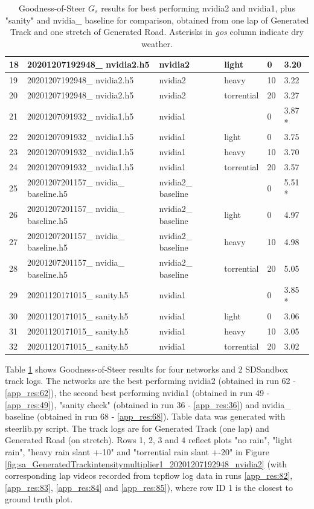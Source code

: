 \begin{table}[]
\begin{center}
\begin{tabular}{|l|l|l|l|l|l|}
18 & 20201207192948\_ nvidia2.h5 & nvidia2 & light & 0 & 3.20 \\ \hline
19 & 20201207192948\_ nvidia2.h5 & nvidia2 & heavy & 10 & 3.22 \\ \hline
20 & 20201207192948\_ nvidia2.h5 & nvidia2 & torrential & 20 & 3.27 \\ \hline
21 & 20201207091932\_ nvidia1.h5 & nvidia1 &  & 0 & 3.87 * \\ \hline
22 & 20201207091932\_ nvidia1.h5 & nvidia1 & light & 0 & 3.75 \\ \hline
23 & 20201207091932\_ nvidia1.h5 & nvidia1 & heavy & 10 & 3.70 \\ \hline
24 & 20201207091932\_ nvidia1.h5 & nvidia1 & torrential & 20 & 3.57 \\ \hline
25 & 20201207201157\_ nvidia\_ baseline.h5 & nvidia2\_ baseline &  & 0 & 5.51 * \\ \hline
26 & 20201207201157\_ nvidia\_ baseline.h5 & nvidia2\_ baseline & light & 0 & 4.97 \\ \hline
27 & 20201207201157\_ nvidia\_ baseline.h5 & nvidia2\_ baseline & heavy & 10 & 4.98 \\ \hline
28 & 20201207201157\_ nvidia\_ baseline.h5 & nvidia2\_ baseline & torrential & 20 & 5.05 \\ \hline
29 & 20201120171015\_ sanity.h5 & nvidia1 &  & 0 & 3.85 * \\ \hline
30 & 20201120171015\_ sanity.h5 & nvidia1 & light & 0 & 3.06 \\ \hline
31 & 20201120171015\_ sanity.h5 & nvidia1 & heavy & 10 & 3.05 \\ \hline
32 & 20201120171015\_ sanity.h5 & nvidia1 & torrential & 20 & 3.02 \\ \hline
\end{tabular}
\end{center}
\caption{Goodness-of-Steer $G_s$ results for best performing nvidia2 and nvidia1, plus "sanity" and nvidia\_ baseline for comparison, obtained from one lap of Generated Track and one stretch of Generated Road. Asterisks in \textit{gos} column indicate dry weather.}
\label{table:goodness-of-steer}
\end{table}
Table \ref{table:goodness-of-steer} shows Goodness-of-Steer results for four networks and 2 SDSandbox track logs. The networks are the best performing nvidia2 (obtained in run 62 - \ref{app_res:62}), the second best performing nvidia1 (obtained in run 49 - \ref{app_res:49}), "sanity check" (obtained in run 36 - \ref{app_res:36}) and nvidia\_ baseline (obtained in run 68 - \ref{app_res:68}). Table data was generated with steerlib.py script. The track logs are for Generated Track (one lap) and Generated Road (on stretch). Rows 1, 2, 3 and 4 reflect plots "no rain", "light rain", "heavy rain slant +-10" and "torrential rain slant +-20" in Figure \ref{fig:sa_GeneratedTrackintensitymultiplier1_20201207192948_nvidia2} (with corresponding lap videos recorded from tcpflow log data in runs \ref{app_res:82}, \ref{app_res:83}, \ref{app_res:84} and  \ref{app_res:85}), where row ID 1 is the closest to ground truth plot.


